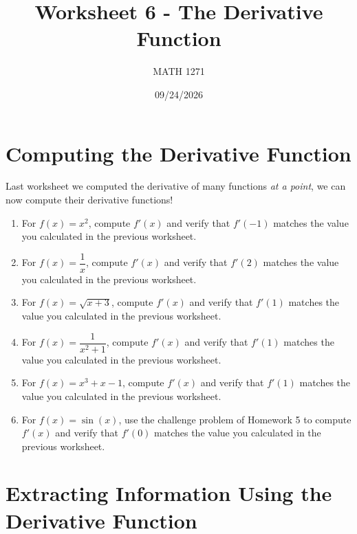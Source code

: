 \documentclass[12pt]{exam}
\title{Worksheet 6 - The Derivative Function}
\author{MATH 1271}
\date{09/24/2026}
\begin{document}
\newpage
\maketitle

\section{Computing the Derivative Function}
Last worksheet we computed the derivative of many functions \textit{at a point},
we can now compute their derivative functions!

\begin{enumerate}
  \item For $f(x) = x^2$, compute $f'(x)$ and verify that $f'(-1)$ matches the value you calculated in the previous worksheet.
    \vfill
  \item For $f(x) = \dfrac{1}{x}$, compute $f'(x)$ and verify that $f'(2)$ matches the value you calculated in the previous worksheet.
    \vfill
  \item For $f(x) = \sqrt{x + 3}$, compute $f'(x)$ and verify that $f'(1)$ matches the value you calculated in the previous worksheet.
    \vfill
    \newpage
  \item For $f(x) = \dfrac{1}{x^2 + 1}$, compute $f'(x)$ and verify that $f'(1)$ matches the value you calculated in the previous worksheet.
    \vfill
  \item For $f(x) = x^3 + x - 1$, compute $f'(x)$ and verify that $f'(1)$ matches the value you calculated in the previous worksheet.
    \vfill
  \item For $f(x) = \sin(x)$, use the challenge problem of Homework 5 to compute $f'(x)$ and verify that $f'(0)$ matches the value you calculated in the previous worksheet.
    \vfill
\end{enumerate}
\newpage

\section{Extracting Information Using the Derivative Function}
\end{document}
